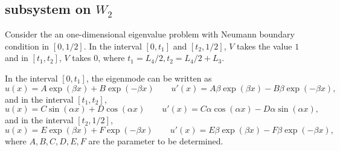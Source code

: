 \documentclass[a4paper,11pt]{article}
\begin{document}
\begin{appendices}
\subsection{subsystem on $W_2$}

Consider the an one-dimensional eigenvalue problem with Neumann boundary condition in $[0, 1/2]$. In the interval $[0, t_1]$ and $[t_2, 1/2]$, $V$ takes the value $1$ and in $[t_1, t_2]$, $V$ takes $0$, where $t_1 = L_4/2, t_2 = L_4/2 + L_3$.

In the interval $[0, t_1]$, the eigenmode can be written as
\begin{equation*}
u(x) = A \exp(\beta x) + B \exp(-\beta x) \qquad u'(x) = A \beta \exp(\beta x) - B \beta \exp(-\beta x),
\end{equation*}
and in the interval $[t_1, t_2]$,
\begin{equation*}
u(x) = C \sin(\alpha x) + D \cos(\alpha x) \qquad u'(x) = C \alpha \cos(\alpha x) - D \alpha \sin(\alpha x),
\end{equation*}
and in the interval $[t_2, 1/2]$,
\begin{equation*}
u(x) = E \exp(\beta x) + F \exp(-\beta x) \qquad u'(x) = E \beta \exp(\beta x) - F \beta \exp(-\beta x),
\end{equation*}
where $A ,B, C, D, E, F$ are the parameter to be determined.


\end{appendices}
\end{document}

